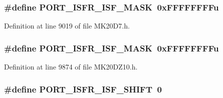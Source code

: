 \subsubsection[{\texorpdfstring{P\+O\+R\+T\+\_\+\+I\+S\+F\+R\+\_\+\+I\+S\+F\+\_\+\+M\+A\+SK}{PORT_ISFR_ISF_MASK}}]{\setlength{\rightskip}{0pt plus 5cm}\#define P\+O\+R\+T\+\_\+\+I\+S\+F\+R\+\_\+\+I\+S\+F\+\_\+\+M\+A\+SK~0x\+F\+F\+F\+F\+F\+F\+F\+Fu}\hypertarget{group___p_o_r_t___register___masks_gabb5d188f3dfe38f0d8bbb870e81fb7e3}{}\label{group___p_o_r_t___register___masks_gabb5d188f3dfe38f0d8bbb870e81fb7e3}


Definition at line 9019 of file M\+K20\+D7.\+h.

\subsubsection[{\texorpdfstring{P\+O\+R\+T\+\_\+\+I\+S\+F\+R\+\_\+\+I\+S\+F\+\_\+\+M\+A\+SK}{PORT_ISFR_ISF_MASK}}]{\setlength{\rightskip}{0pt plus 5cm}\#define P\+O\+R\+T\+\_\+\+I\+S\+F\+R\+\_\+\+I\+S\+F\+\_\+\+M\+A\+SK~0x\+F\+F\+F\+F\+F\+F\+F\+Fu}\hypertarget{group___p_o_r_t___register___masks_gabb5d188f3dfe38f0d8bbb870e81fb7e3}{}\label{group___p_o_r_t___register___masks_gabb5d188f3dfe38f0d8bbb870e81fb7e3}


Definition at line 9874 of file M\+K20\+D\+Z10.\+h.

\subsubsection[{\texorpdfstring{P\+O\+R\+T\+\_\+\+I\+S\+F\+R\+\_\+\+I\+S\+F\+\_\+\+S\+H\+I\+FT}{PORT_ISFR_ISF_SHIFT}}]{\setlength{\rightskip}{0pt plus 5cm}\#define P\+O\+R\+T\+\_\+\+I\+S\+F\+R\+\_\+\+I\+S\+F\+\_\+\+S\+H\+I\+FT~0}\hypertarget{group___p_o_r_t___register___masks_ga678f290447622562272513d57eb2bf78}{}\label{group___p_o_r_t___register___masks_ga678f290447622562272513d57eb2bf78}


